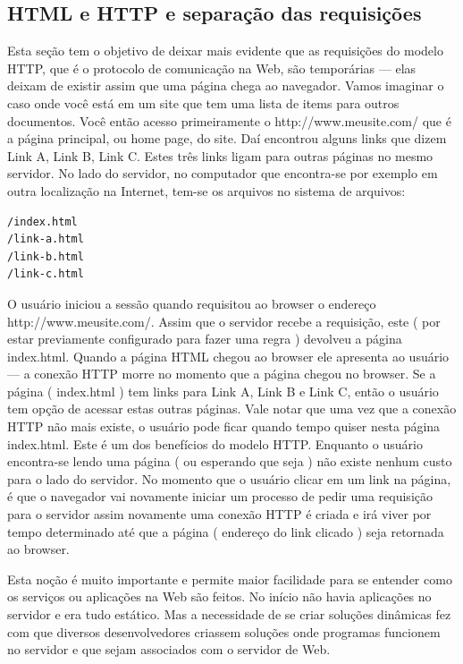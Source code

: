 \documentclass[a4paper]{article}
\begin{document}
\subsection { HTML e HTTP e separação das requisições } 

Esta seção tem o objetivo de deixar mais evidente que as requisições do modelo HTTP, que é o protocolo de comunicação na Web, são temporárias --- elas deixam de existir assim que uma página chega ao navegador. Vamos imaginar o caso onde você está em um site que tem uma lista de items para outros documentos. Você então acesso primeiramente o http://www.meusite.com/ que é a página principal, ou home page, do site. Daí encontrou alguns links que dizem Link A, Link B, Link C. Estes três links ligam para outras páginas no mesmo servidor. No lado do servidor, no computador que encontra-se por exemplo em outra localização na Internet, tem-se os arquivos no sistema de arquivos: 

\begin{verbatim} 
/index.html  
/link-a.html
/link-b.html
/link-c.html
\end{verbatim} 

O usuário iniciou a sessão quando requisitou ao browser o endereço http://www.meusite.com/. Assim que o servidor recebe a requisição, este ( por estar previamente configurado para fazer uma regra ) devolveu a página index.html. Quando a página HTML chegou ao browser ele apresenta ao usuário --- a conexão HTTP morre no momento que a página chegou no browser. Se a página ( index.html ) tem links para Link A, Link B e Link C, então o usuário tem opção de acessar estas outras páginas. Vale notar que uma vez que a conexão HTTP não mais existe, o usuário pode ficar quando tempo quiser nesta página index.html. Este é um dos benefícios do modelo HTTP. Enquanto o usuário encontra-se lendo uma página ( ou esperando que seja ) não existe nenhum custo para o lado do servidor. No momento que o usuário clicar em um link na página, é que o navegador vai novamente iniciar um processo de pedir uma requisição para o servidor assim novamente uma conexão HTTP é criada e irá viver por tempo determinado até que a página ( endereço do link clicado ) seja retornada ao browser.

Esta noção é muito importante e permite maior facilidade para se entender como os serviços ou aplicações na Web são feitos. No início não havia aplicações no servidor e era tudo estático.  Mas a necessidade de se criar soluções dinâmicas fez com que diversos desenvolvedores criassem soluções onde programas funcionem no servidor e que sejam associados com o servidor de Web.
\end{document}
